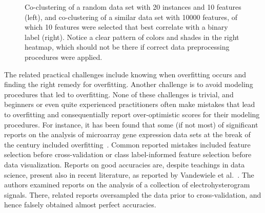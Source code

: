 \begin{refsection}
\begin{figure}[htbp]
\caption{Co-clustering of a random data set with 20 instances and 10 features (left), and co-clustering of a similar data set with 10000 features, of which 10 features were selected that best correlate with a binary label (right). Notice a clear pattern of colors and shades in the right heatmap, which should not be there if correct data preprocessing procedures were applied.}
\label{fig:heatmaps-overfitting}
\end{figure}

The related practical challenges include knowing when overfitting occurs and finding the right remedy for overfitting. Another challenge is to avoid modeling procedures that led to overfitting. None of these challenges is trivial, and beginners or even quite experienced practitioners often make mistakes that lead to overfitting and consequentially report over-optimistic scores for their modeling procedures. For instance, it has been found that some (if not most) of significant reports on the analysis of microarray gene expression data sets at the break of the century included overfitting~\citep{2003-Simon}. Common reported mistakes included feature selection before cross-validation or class label-informed feature selection before data visualization. Reports on good accuracies are, despite teachings in data science, present also in recent literature, as reported by Vandewiele et al.~\citep{2019-Vandewiele}. The authors examined reports on the analysis of a collection of electrohysterogram signals. There, related reports oversampled the data prior to cross-validation, and hence falsely obtained almost perfect accuracies.



\end{refsection}
